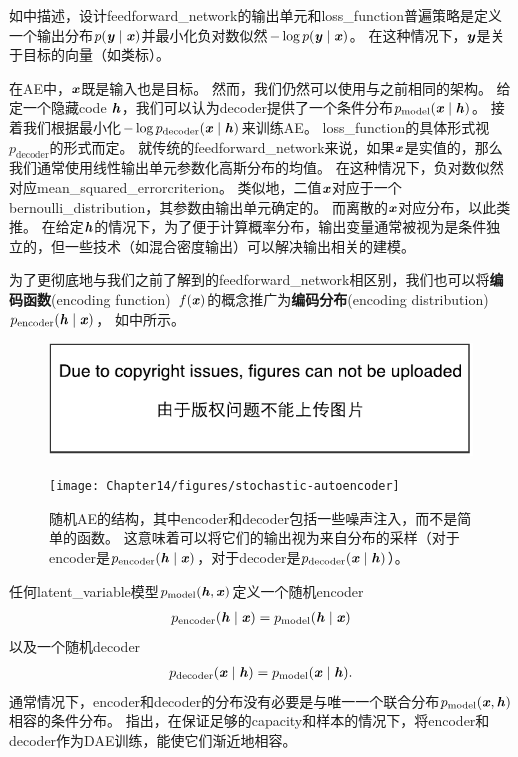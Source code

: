 如中描述，设计\gls{feedforward_network}的输出单元和\gls{loss_function}普遍策略是定义一个输出分布$p(\boldsymbol{\mathit{y}} \mid \boldsymbol{\mathit{x}}) $并最小化负对数似然$-\log p(\boldsymbol{\mathit{y}} \mid \boldsymbol{\mathit{x}})$。
在这种情况下，$\boldsymbol{\mathit{y}}$是关于目标的向量（如类标）。


在\gls{AE}中，$\boldsymbol{\mathit{x}}$既是输入也是目标。
然而，我们仍然可以使用与之前相同的架构。
给定一个隐藏\gls{code} $\boldsymbol{\mathit{h}}$，我们可以认为\gls{decoder}提供了一个条件分布$p_{\text{model}}(\boldsymbol{\mathit{x}} \mid \boldsymbol{\mathit{h}})$。
接着我们根据最小化$-\log p_{\text{decoder}}(\boldsymbol{\mathit{x}} \mid \boldsymbol{\mathit{h}})$来训练\gls{AE}。
\gls{loss_function}的具体形式视$p_{\text{decoder}}$的形式而定。
就传统的\gls{feedforward_network}来说，如果$\boldsymbol{\mathit{x}}$是实值的，那么我们通常使用线性输出单元参数化高斯分布的均值。
在这种情况下，负对数似然对应\gls{mean_squared_error}\gls{criterion}。
类似地，二值$\boldsymbol{\mathit{x}}$对应于一个\gls{bernoulli_distribution}，其参数由输出单元确定的。
而离散的$\boldsymbol{\mathit{x}}$对应分布，以此类推。
在给定$\boldsymbol{\mathit{h}}$的情况下，为了便于计算概率分布，输出变量通常被视为是条件独立的，但一些技术（如混合密度输出）可以解决输出相关的建模。


为了更彻底地与我们之前了解到的\gls{feedforward_network}相区别，我们也可以将\textbf{编码函数}(encoding function)~$f(\boldsymbol{\mathit{x}})$的概念推广为\textbf{编码分布}(encoding distribution)~$ p_{\text{encoder}}(\boldsymbol{\mathit{h}} \mid \boldsymbol{\mathit{x}})$， 如中所示。

\begin{figure}[!htb]
\ifOpenSource
\centerline{\includegraphics{figure.pdf}}
\else
\centerline{\texttt{[image: Chapter14/figures/stochastic-autoencoder]}}
\fi
\caption{随机\gls{AE}的结构，其中\gls{encoder}和\gls{decoder}包括一些噪声注入，而不是简单的函数。
这意味着可以将它们的输出视为来自分布的采样（对于\gls{encoder}是$p_{\text{encoder}}(\boldsymbol{\mathit{h}} \mid \boldsymbol{\mathit{x}})$，对于\gls{decoder}是$p_{\text{decoder}}(\boldsymbol{\mathit{x}}\mid \boldsymbol{\mathit{h}})$）。}
\label{fig:chap14_stochastic-autoencoder}
\end{figure}

任何\gls{latent_variable}模型$p_{\text{model}}(\boldsymbol{\mathit{h}}, \boldsymbol{\mathit{x}})$定义一个随机\gls{encoder}
\begin{align}
p_{\text{encoder}}(\boldsymbol{\mathit{h}} \mid \boldsymbol{\mathit{x}}) = p_{\text{model}}(\boldsymbol{\mathit{h}}\mid\boldsymbol{\mathit{x}})
\end{align}
以及一个随机\gls{decoder}
\begin{align}
p_{\text{decoder}}(\boldsymbol{\mathit{x}} \mid \boldsymbol{\mathit{h}}) = p_{\text{model}}(\boldsymbol{\mathit{x}}\mid\boldsymbol{\mathit{h}}).
\end{align}
通常情况下，\gls{encoder}和\gls{decoder}的分布没有必要是与唯一一个联合分布$p_{\text{model}}(\boldsymbol{\mathit{x}}, \boldsymbol{\mathit{h}})$相容的条件分布。
\citet{Alain-et-al-arxiv2015}指出，在保证足够的\gls{capacity}和样本的情况下，将\gls{encoder}和\gls{decoder}作为\gls{DAE}训练，能使它们渐近地相容。




